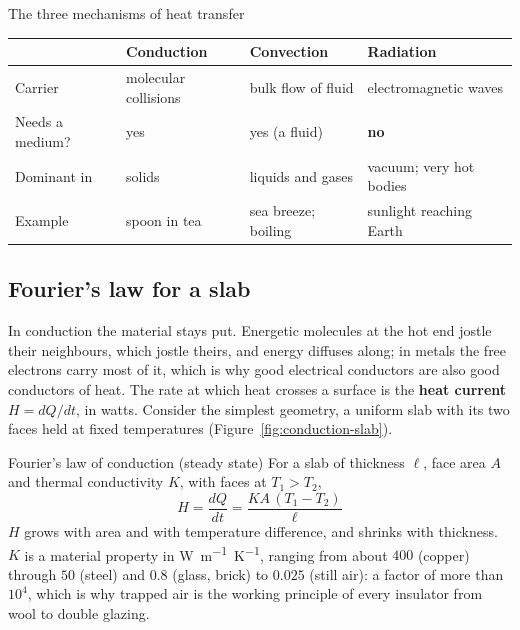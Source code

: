 \begin{tablebox}{The three mechanisms of heat transfer}
\begin{center}
\begin{tabular}{@{}llll@{}}
\toprule
 & \textbf{Conduction} & \textbf{Convection} & \textbf{Radiation}\\
\midrule
Carrier & molecular collisions & bulk flow of fluid & electromagnetic waves\\
Needs a medium? & yes & yes (a fluid) & \textbf{no}\\
Dominant in & solids & liquids and gases & vacuum; very hot bodies\\
Example & spoon in tea & sea breeze; boiling & sunlight reaching Earth\\
\bottomrule
\end{tabular}
\end{center}
\end{tablebox}

\subsection{Fourier's law for a slab}

In conduction the material stays put. Energetic molecules at the hot end jostle their neighbours, which
jostle theirs, and energy diffuses along; in metals the free electrons carry most of it, which is why
good electrical conductors are also good conductors of heat. The rate at which heat crosses a surface
is the \textbf{heat current} $H = dQ/dt$, in watts. Consider the simplest geometry, a uniform slab with
its two faces held at fixed temperatures (Figure~\ref{fig:conduction-slab}).

\begin{figure}[htbp]
\centering
{}
\end{figure}

\begin{keybox}{Fourier's law of conduction (steady state)}
For a slab of thickness $\ell$, face area $A$ and thermal conductivity $K$, with faces at $T_1>T_2$,
\[
\boxed{\;H = \frac{dQ}{dt} = \frac{K A\,(T_1 - T_2)}{\ell}\;}
\]
$H$ grows with area and with temperature difference, and shrinks with thickness. $K$ is a material
property in \si{W.m^{-1}.K^{-1}}, ranging from about $400$ (copper) through $50$ (steel) and $0.8$
(glass, brick) to $0.025$ (still air): a factor of more than $10^4$, which is why trapped air is the
working principle of every insulator from wool to double glazing.
\end{keybox}

